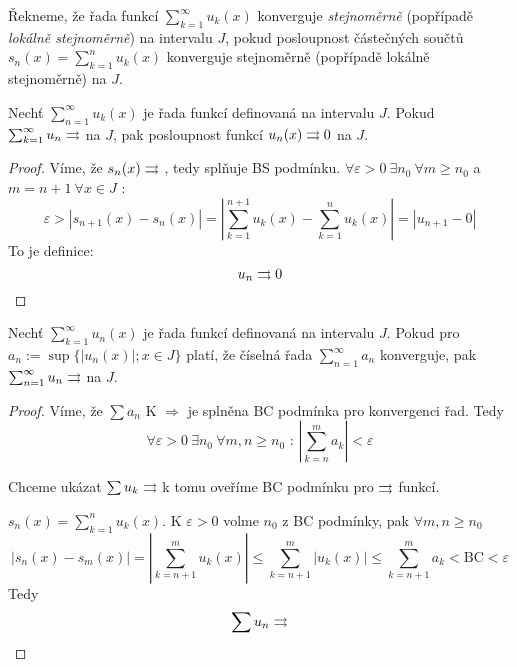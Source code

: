 \begin{definice}
Řekneme, že řada funkcí $\sum_{k=1}^{\infty} u_k (x)$ konverguje \emph{stejnoměrně} (popřípadě \emph{lokálně stejnoměrně}) na intervalu $J$, pokud posloupnost částečných součtů $s_n(x) = \sum_{k=1}^{n} u_k (x)$ konverguje stejnoměrně (popřípadě lokálně stejnoměrně) na $J$.
\end{definice}

\begin{vetal}
Nechť $\sum_{n=1}^{\infty} u_k (x)$ je řada funkcí definovaná na intervalu $J$. Pokud $\sum_{k=1}^{\infty} u_n \rightrightarrows$ na $J$, pak posloupnost funkcí $u_n (x) \rightrightarrows 0$ na $J$.
\end{vetal}
\begin{proof}
Víme, že $s_n(x) \rightrightarrows $ , tedy splňuje BS podmínku. 
$\forall \varepsilon > 0 \ \exists n_0 \ \forall m \geq n_0$ a $ m = n+1 \ \forall x \in J$ :
$$\varepsilon > |s_{n+1}(x) - s_n(x)| = \left| \sum_{k=1}^{n+1} u_k(x) - \sum_{k=1}^{n}u_k(x) \right| = |u_{n+1} - 0|$$
To je definice: $$ u_n \rightrightarrows 0$$
\end{proof}

\begin{vetal}
Nechť $\sum_{k=1}^{\infty} u_n (x)$ je řada funkcí definovaná na intervalu $J$. Pokud pro $a_n := \sup \{ | u_n (x) |; x \in J \}$ platí, že číselná řada $\sum_{n=1}^{\infty} a_n$ konverguje, pak $\sum_{n=1}^{\infty} u_n \rightrightarrows$ na $J$.
\end{vetal}
\begin{proof}
Víme, že $\sum a_n $ K $\Rightarrow $ je splněna BC podmínka pro konvergenci řad.
Tedy 
$$\forall \varepsilon > 0 \ \exists n_0 \ \forall m,n \geq n_0 \textrm{ : } \left| \sum_{k = n}^m a_k \right| < \varepsilon$$

Chceme ukázat $\sum u_k \rightrightarrows$ k tomu oveříme BC podmínku pro $\rightrightarrows$ funkcí.

$s_n(x) = \sum_{k=1}^n u_k(x)$. K $\varepsilon > 0$ volme $n_0$ z BC podmínky, pak $\forall m,n \geq n_0$
$$ | s_n(x) - s_m(x) | = \left| \sum_{k=n+1}^m u_k(x) \right| \leq \sum_{k=n+1}^m |u_k(x)| \leq \sum_{k=n+1}^m a_k < \textrm{BC} < \varepsilon $$
Tedy $$\sum u_n \rightrightarrows $$
\end{proof}


